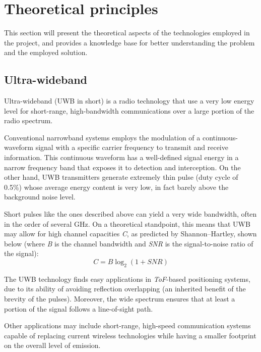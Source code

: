\section{Theoretical principles}\label{sec:theory}
This section will present the theoretical aspects of the technologies employed in the project, and provides a knowledge base for better understanding the problem and the employed solution.


\subsection{Ultra-wideband}
Ultra-wideband (UWB in short) is a radio technology that use a very low energy level for short-range, high-bandwidth communications over a large portion of the radio spectrum.

Conventional narrowband systems employs the modulation of a continuous-waveform signal with a specific carrier frequency to transmit and receive information.
This continuous waveform has a well-defined signal energy in a narrow frequency band that exposes it to detection and interception.
On the other hand, UWB transmitters generate extremely thin pulse (duty cycle of 0.5\%) whose average energy content is very low, in fact barely above the background noise level.

Short pulses like the ones described above can yield a very wide bandwidth, often in the order of several \si{\giga\hertz}.
On a theoretical standpoint, this means that UWB may allow for high channel capacities \emph{C}, as predicted by Shannon–Hartley, shown below (where \emph{B} is the channel bandwidth and \emph{SNR} is the signal-to-noise ratio of the signal):
\begin{equation}
    \textit{C} = \textit{B}\log_2(1 + \textit{SNR})
\end{equation}

The UWB technology finds easy applications in \emph{ToF}-based positioning systems, due to its ability of avoiding reflection overlapping (an inherited benefit of the brevity of the pulses).
Moreover, the wide spectrum ensures that at least a portion of the signal follows a line-of-sight path.

Other applications may include short-range, high-speed communication systems capable of replacing current wireless technologies while having a smaller footprint on the overall level of emission.


